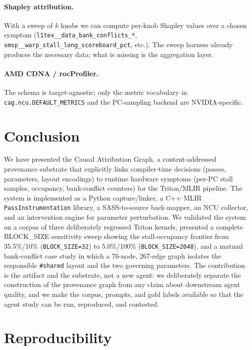 \documentclass[10pt]{article}
\begin{document}
\paragraph{Shapley attribution.} With a sweep of $k$ knobs we can compute per-knob Shapley values over a chosen symptom (\texttt{l1tex\_\_data\_bank\_conflicts\_*}, \texttt{smsp\_\_warp\_stall\_long\_scoreboard\_pct}, etc.). The sweep harness already produces the necessary data; what is missing is the aggregation layer.

\paragraph{AMD CDNA / rocProfiler.} The schema is target-agnostic; only the metric vocabulary in \texttt{cag.ncu.DEFAULT\_METRICS} and the PC-sampling backend are NVIDIA-specific.

\section{Conclusion}

We have presented the Causal Attribution Graph, a content-addressed provenance substrate that explicitly links compiler-time decisions (passes, parameters, layout encodings) to runtime hardware symptoms (per-PC stall samples, occupancy, bank-conflict counters) for the Triton/MLIR pipeline. The system is implemented as a Python capture/linker, a C++ MLIR \texttt{PassInstrumentation} library, a SASS-to-source back-mapper, an NCU collector, and an intervention engine for parameter perturbation. We validated the system on a corpus of three deliberately regressed Triton kernels, presented a complete BLOCK\_SIZE sensitivity sweep showing the stall-occupancy frontier from 35.5\%/10\% (\texttt{BLOCK\_SIZE=32}) to 5.0\%/100\% (\texttt{BLOCK\_SIZE=2048}), and a matmul bank-conflict case study in which a 76-node, 267-edge graph isolates the responsible \texttt{\#shared} layout and the two governing parameters. The contribution is the artifact and the substrate, not a new agent: we deliberately separate the construction of the provenance graph from any claim about downstream agent quality, and we make the corpus, prompts, and gold labels available so that the agent study can be run, reproduced, and contested.

\section*{Reproducibility}
\end{document}

